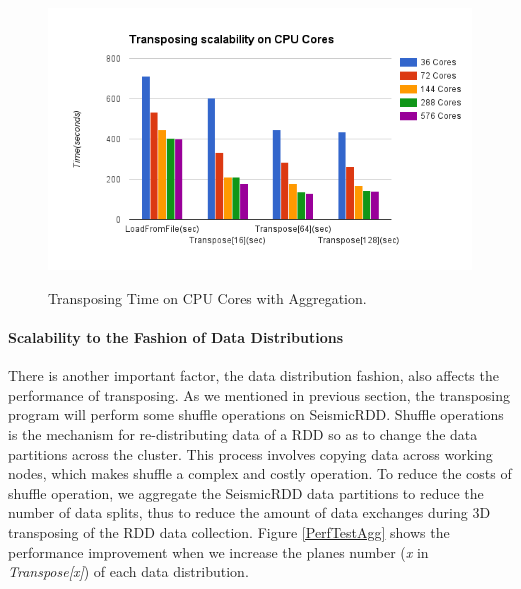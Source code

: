 \begin{figure}[h]
\centering
\includegraphics[scale=0.7]{figures/PerfTestCoresAgg.png}\\
\caption{Transposing Time on CPU Cores with Aggregation.}\label{PerfTestCoresAgg}
\end{figure}


\paragraph{Scalability to the Fashion of Data Distributions}

There is another important factor, the data distribution fashion, also affects the performance of transposing. As we mentioned in previous section, the transposing program will perform some shuffle operations on SeismicRDD. Shuffle operations \cite{SparkShuffle} is the mechanism for re-distributing data of a RDD so as to change the data partitions across the cluster. This process involves copying data across working nodes, which makes shuffle a complex and costly operation. To reduce the costs of shuffle operation, we aggregate the SeismicRDD data partitions to reduce the number of data splits, thus to reduce the amount of data exchanges during 3D transposing of the RDD data collection. Figure \ref{PerfTestAgg} shows the performance improvement when we increase the planes number (\emph{x} in \emph{Transpose[x]}) of each data distribution. 

